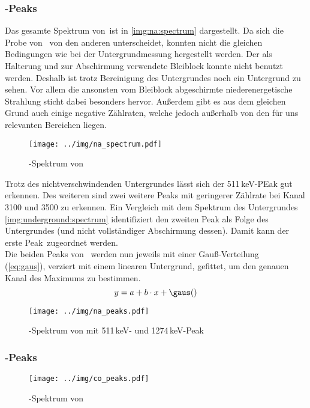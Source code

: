 \subsubsection{\na-Peaks}
Das gesamte Spektrum von \na\,ist in \autoref{img:na:spectrum} dargestellt. Da sich die Probe von \na\, von den anderen unterscheidet, konnten nicht die 
gleichen Bedingungen wie bei der Untergrundmessung hergestellt werden. Der als Halterung und zur Abschirmung verwendete Bleiblock konnte nicht 
benutzt werden. Deshalb ist trotz Bereinigung des Untergrundes noch ein Untergrund zu sehen. Vor allem die ansonsten vom Bleiblock abgeschirmte 
niederenergetische Strahlung sticht dabei besonders hervor. Außerdem gibt es aus dem gleichen Grund auch einige negative Zählraten, welche jedoch 
außerhalb von den für uns relevanten Bereichen liegen.
\begin{figure}[H]
\begin{center}
  \texttt{[image: ../img/na\_spectrum.pdf]}
  \caption{\textgamma-Spektrum von }
  \label{img:na:spectrum}
\end{center}
\end{figure}
Trotz des nichtverschwindenden Untergrundes lässt sich der 511\,keV-PEak gut erkennen. Des weiteren sind zwei weitere Peaks mit geringerer 
Zählrate bei Kanal 3100 und 3500 zu erkennen. Ein Vergleich mit dem Spektrum des Untergrundes \autoref{img:underground:spectrum} identifiziert 
den zweiten Peak als Folge des Untergrundes (und nicht vollständiger Abschirmung dessen). Damit kann der erste Peak \na\,zugeordnet werden.\\[\baselineskip]
Die beiden Peaks von \na\, werden nun jeweils mit einer Gauß-Verteilung \\(\autoref{eq:gaus}), verziert mit einem linearen Untergrund, 
gefittet, um den genauen Kanal des Maximums zu bestimmen.
\begin{equation}
  y = a + b\cdot x + \gaus()
\end{equation}
\begin{figure}[H]
\begin{center}
  \texttt{[image: ../img/na\_peaks.pdf]}
  \caption{\textgamma-Spektrum von  mit 511\,keV- und 1274\,keV-Peak}
  \label{img:na:peaks}
\end{center}
\end{figure}

\subsubsection{\co-Peaks}
\begin{figure}[H]
\begin{center}
  \texttt{[image: ../img/co\_peaks.pdf]}
  \caption{\textgamma-Spektrum von }
  \label{img:co:peak}
\end{center}
\end{figure}

